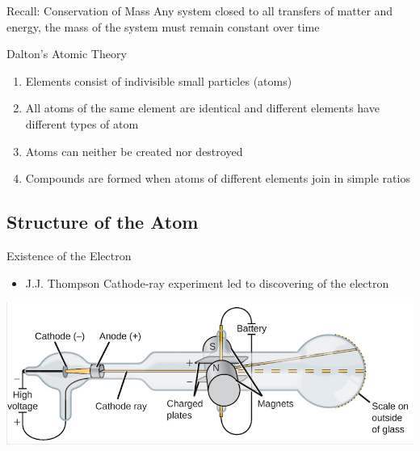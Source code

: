\documentclass[11pt]{beamer}
\begin{document}
\begin{frame}{Recall: Conservation of Mass}
  Any system closed to all transfers of matter and energy, the mass
  of the system must remain constant over time
\end{frame}

\begin{frame}{Dalton's Atomic Theory}
  \begin{enumerate}
  \item Elements consist of indivisible small particles (atoms)
  \item All atoms of the same element are identical and
    different elements have different types of atom
  \item Atoms can neither be created nor destroyed
  \item Compounds are formed when atoms of different
    elements join in simple ratios
  \end{enumerate}
\end{frame}

\subsection{Structure of the Atom}

\begin{frame}{Existence of the Electron}
  \begin{itemize}
  \item J.J. Thompson Cathode-ray experiment led to
    discovering of the electron
  \end{itemize}

  \centering
  \includegraphics[scale=0.3]{cathod_ray}
\end{frame}
\end{document}
